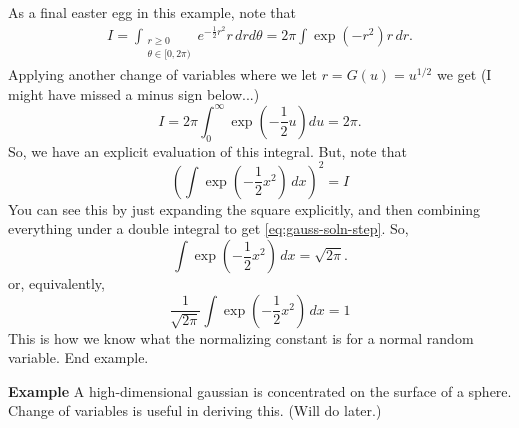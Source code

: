 \documentclass{book}
\newcommand{\dx}{\, dx}
\newcommand{\dr}{\, dr}
\begin{document}
As a final easter egg in this example, note that 
\begin{align}
I = \int_{\substack{r \geq 0\\ \theta \in [0, 2\pi)}} e^{-\frac{1}{2}r^2} r \dr d\theta = 2\pi \int \exp(-r^2) r\dr. 
\end{align}
Applying another change of variables where we let $r = G(u) = u^{1/2}$ we get (I might have missed a minus sign below...)
$$
I = 2\pi \int_0^\infty \exp(-\frac{1}{2}u) du = 2\pi. 
$$
So, we have an explicit evaluation of this integral. But, note that
$$
\left(\int \exp(-\frac{1}{2}x^2) \dx\right)^2 = I
$$
You can see this by just expanding the square explicitly, and then combining everything under a double integral to get \eqref{eq:gauss-soln-step}. So, 
$$
\int \exp(-\frac{1}{2}x^2)\dx = \sqrt{2\pi}. 
$$
or, equivalently, 
$$
\frac{1}{\sqrt{2\pi}}\int \exp(-\frac{1}{2}x^2)\dx = 1
$$
This is how we know what the normalizing constant is for a normal random variable. 
End example. 

\vspace{1em}
\noindent
\textbf{Example} A high-dimensional gaussian is concentrated on the surface of a sphere. Change of variables is useful in deriving this. (Will do later.) 
\end{document}
